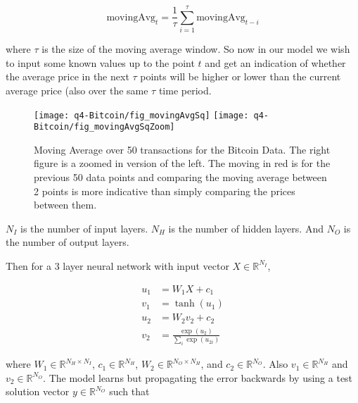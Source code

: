 \documentclass{article}
\newcommand{\RR}{\mathbb{R}}
\begin{document}
\begin{equation*}
	\text{movingAvg}_t = \frac{1}{\tau} \sum_{i = 1}^{\tau} \text{movingAvg}_{t-i}
\end{equation*}

where $\tau$ is the size of the moving average window. So now in our model we wish to input some known values up to the point $t$ and get an indication of whether the average price in the next $\tau$ points will be higher or lower than the current average price (also over the same $\tau$ time period.

\begin{figure}[h!]
		\centering
		\texttt{[image: q4-Bitcoin/fig\_movingAvgSq]}
		\texttt{[image: q4-Bitcoin/fig\_movingAvgSqZoom]}
		\caption{Moving Average over 50 transactions for the Bitcoin Data. The right figure is a zoomed in version of the left. The moving in red is for the previous 50 data points and comparing the moving average between 2 points is more indicative than simply comparing the prices between them.}
		\label{fig:sort}
\end{figure}


$N_I$ is the number of input layers. $N_H$ is the number of hidden layers. And $N_O$ is the number of output layers. 

Then for a 3 layer neural network with input vector $X \in \RR^{N_I}$,

\begin{equation}
	\begin{split}
		u_1 &= W_1 X + c_1 \\
		v_1 &= \tanh(u_1) \\
		u_2 &= W_2 v_2 + c_2 \\
		v_2 &= \frac{\exp(u_2)}{\sum_{i}\exp(u_{2i})}	
	\end{split}
\end{equation}
	
where $W_1 \in \RR^{N_H \times N_I}$, $c_1 \in \RR^{N_H}$, $W_2 \in \RR^{N_O \times N_H}$, and $c_2 \in \RR^{N_O}$. Also $v_1 \in \RR^{N_H}$ and $v_2 \in \RR^{N_O}$. The model learns but propagating the error backwards by using a test solution vector $y \in \RR^{N_O}$ such that 
\end{document}
